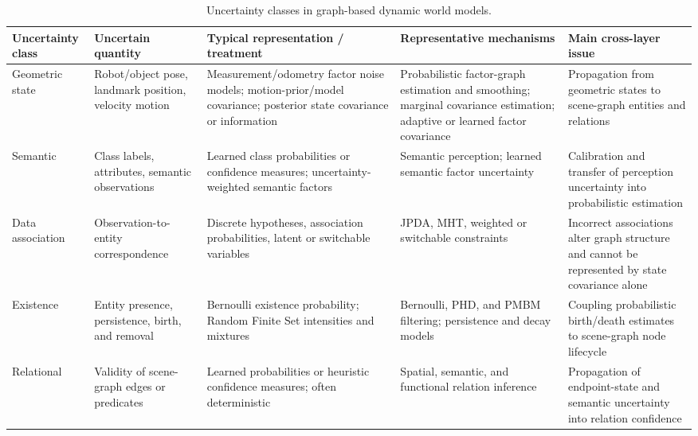 \begin{table}[t]
\centering
\caption{Uncertainty classes in graph-based dynamic world models.}
\label{tab:uncertainty_classes}
\renewcommand{\arraystretch}{1.15}
\setlength{\tabcolsep}{4pt}
\scriptsize
\begin{tabularx}{\textwidth}{
    >{\raggedright\arraybackslash}p{}
    >{\raggedright\arraybackslash}p{}
    >{\raggedright\arraybackslash}p{}
    >{\raggedright\arraybackslash}p{}
    >{\raggedright\arraybackslash}X}
\hline
\textbf{Uncertainty class} &
\textbf{Uncertain quantity} &
\textbf{Typical representation / treatment} &
\textbf{Representative mechanisms} &
\textbf{Main cross-layer issue} \\
\hline

Geometric state &
Robot/object pose, landmark position, velocity motion &
Measurement/odometry factor noise models; motion-prior/model covariance; posterior state covariance or information &
Probabilistic factor-graph estimation and smoothing; marginal covariance estimation; adaptive or learned factor covariance &
Propagation from geometric states to scene-graph entities and relations \\

Semantic &
Class labels, attributes, semantic observations &
Learned class probabilities or confidence measures; uncertainty-weighted semantic factors &
Semantic perception; learned semantic factor uncertainty &
Calibration and transfer of perception uncertainty into probabilistic estimation \\

Data association &
Observation-to-entity correspondence &
Discrete hypotheses, association probabilities, latent or switchable variables &
JPDA, MHT, weighted or switchable constraints &
Incorrect associations alter graph structure and cannot be represented by state covariance alone \\

Existence &
Entity presence, persistence, birth, and removal &
Bernoulli existence probability; Random Finite Set intensities and mixtures &
Bernoulli, PHD, and PMBM filtering; persistence and decay models &
Coupling probabilistic birth/death estimates to scene-graph node lifecycle \\

Relational &
Validity of scene-graph edges or predicates &
Learned probabilities or heuristic confidence measures; often deterministic &
Spatial, semantic, and functional relation inference &
Propagation of endpoint-state and semantic uncertainty into relation confidence \\

\hline
\end{tabularx}
\end{table}


